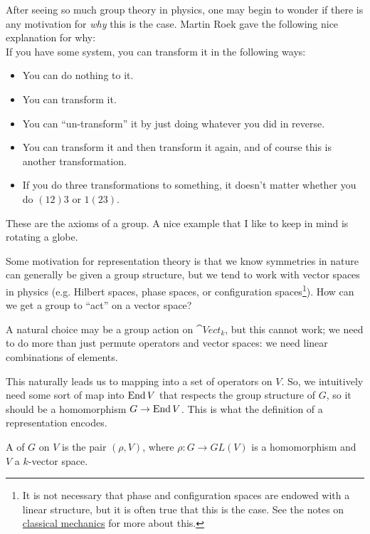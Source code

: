 \documentclass[11pt]{article}
\begin{document}
\begin{reemark}
    After seeing so much group theory in physics, one may begin to
    wonder if there is any motivation for \emph{why} this is the case.
    Martin Roek gave the following nice explanation for why:\\
    
    \noin
    If you have some system, you can transform it in the following
    ways:
    \begin{itemize}
        \item You can do nothing to it.
        \item You can transform it.
        \item You can ``un-transform'' it by just doing whatever you did
        in reverse.
        \item You can transform it and then transform it again,
        and of course this is another transformation.
        \item If you do three transformations to something,
        it doesn't matter whether you do $(12)3$ or $1(23)$.
    \end{itemize}
    These are the axioms of a group. A nice example that I like
    to keep in mind is rotating a globe.
\end{reemark}

Some motivation for representation theory is that we
know symmetries in nature can generally be given a group structure,
but we tend to work with vector spaces in physics (e.g. Hilbert
spaces, phase spaces, or configuration spaces\footnote{It is
not necessary that phase and configuration spaces are endowed with a linear
structure, but it is often true that this is the case.
See the notes on 
\href{https://github.com/will-lancer/notes/blob/main/Physics/Four_Mechanics/FourMechanics.pdf}{classical mechanics} 
for more about this.}).
How can we get a group to ``act'' on a vector space?

A natural choice may be a group action on $\cat{Vect}_k$, 
but this cannot work; we need to do more than just permute
operators and vector spaces: we need linear combinations of elements.

This naturally leads us to mapping into a set of operators on 
$V$. So, we intuitively need some sort of map into $\operatorname{End}{V}$ that 
respects the group structure of $G$, so it should be a homomorphism
$G \to \operatorname{End}{V}$. This is what the definition of a representation encodes.

\begin{definition}
    A  of $G$ on $V$ is the pair $(\rho, V)$,
    where $\rho \colon G \to GL(V)$ is a homomorphism and $V$
    a $k$-vector space.
\end{definition}
\end{document}
